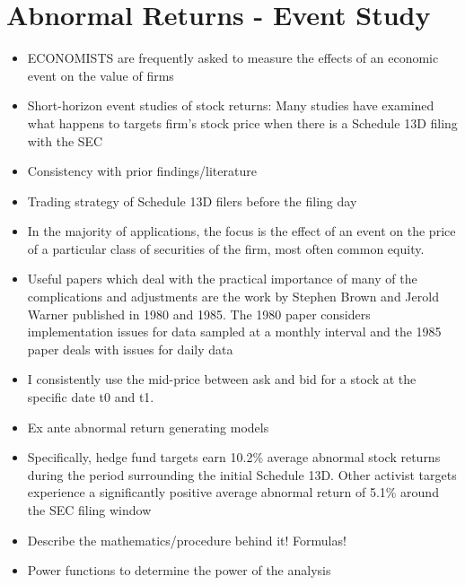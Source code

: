 \documentclass[12pt]{article}
\begin{document}
\section{Abnormal Returns - Event Study} 


    \begin{itemize}
        
        \item ECONOMISTS are frequently asked to measure the effects of an economic event on the value of firms \citep{MacKinlay1997}

        \item Short-horizon event studies of stock returns: Many studies have examined what happens to targets firm’s stock price when there is a Schedule 13D filing with the SEC \citep{CoffeeJr.2014}

        \item Consistency with prior findings/literature

        \item Trading strategy of Schedule 13D filers before the filing day \citep{Collin-Dufresne2015}
        
        \item In the majority of applications, the focus is the effect of an event on the price of a particular class of securities of the firm, most often common equity. \citep{MacKinlay1997}

        \item Useful papers which deal with the practical importance of many of the complications and adjustments are the work by Stephen Brown and Jerold Warner published in 1980 and 1985. The 1980 paper considers implementation issues for data sampled at a monthly interval and the 1985 paper deals with issues for daily data \citep{MacKinlay1997}

        \item I consistently use the mid-price between ask and bid for a stock at the specific date t0 and t1. \citep{Mohr2012}

        \item Ex ante abnormal return generating models \citep{Kolari2010}

        \item Specifically, hedge fund targets earn 10.2\% average abnormal stock returns during the period surrounding the initial Schedule 13D. Other activist targets experience a significantly positive average abnormal return of 5.1\% around the SEC filing window \citep{Klein2009}

        \item Describe the mathematics/procedure behind it! Formulas! 

        \item Power functions to determine the power of the analysis

    \end{itemize}
\end{document}
